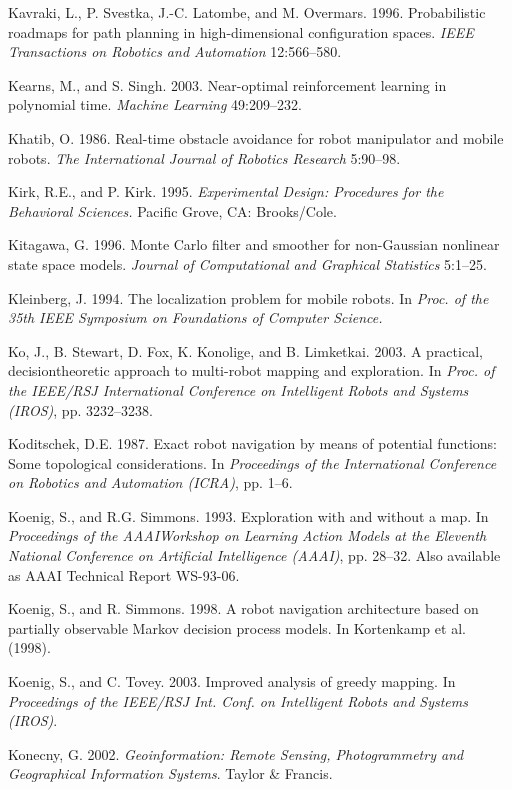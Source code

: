 \documentclass[10pt,a4paper]{article}
\begin{document}
Kavraki, L., P. Svestka, J.-C. Latombe, and M. Overmars. 1996. Probabilistic roadmaps
for path planning in high-dimensional configuration spaces. \textit{IEEE Transactions on
Robotics and Automation} 12:566–580.

Kearns, M., and S. Singh. 2003. Near-optimal reinforcement learning in polynomial
time. \textit{Machine Learning} 49:209–232.

Khatib, O. 1986. Real-time obstacle avoidance for robot manipulator and mobile
robots. \textit{The International Journal of Robotics Research} 5:90–98.

Kirk, R.E., and P. Kirk. 1995. \textit{Experimental Design: Procedures for the Behavioral Sciences.}
Pacific Grove, CA: Brooks/Cole.

Kitagawa, G. 1996. Monte Carlo filter and smoother for non-Gaussian nonlinear state
space models. \textit{Journal of Computational and Graphical Statistics }5:1–25.

Kleinberg, J. 1994. The localization problem for mobile robots. In \textit{Proc. of the 35th
IEEE Symposium on Foundations of Computer Science.}

Ko, J., B. Stewart, D. Fox, K. Konolige, and B. Limketkai. 2003. A practical, decisiontheoretic
approach to multi-robot mapping and exploration. In \textit{Proc. of the IEEE/RSJ
International Conference on Intelligent Robots and Systems (IROS)}, pp. 3232–3238.

Koditschek, D.E. 1987. Exact robot navigation by means of potential functions: Some
topological considerations. In \textit{Proceedings of the International Conference on Robotics
and Automation (ICRA)}, pp. 1–6.

Koenig, S., and R.G. Simmons. 1993. Exploration with and without a map. In \textit{Proceedings
of the AAAIWorkshop on Learning Action Models at the Eleventh National Conference
on Artificial Intelligence (AAAI)}, pp. 28–32. Also available as AAAI Technical
Report WS-93-06.

Koenig, S., and R. Simmons. 1998. A robot navigation architecture based on partially
observable Markov decision process models. In Kortenkamp et al. (1998).

Koenig, S., and C. Tovey. 2003. Improved analysis of greedy mapping. In \textit{Proceedings
of the IEEE/RSJ Int. Conf. on Intelligent Robots and Systems (IROS)}.

Konecny, G. 2002. \textit{Geoinformation: Remote Sensing, Photogrammetry and Geographical
Information Systems}. Taylor \& Francis.
\end{document}
